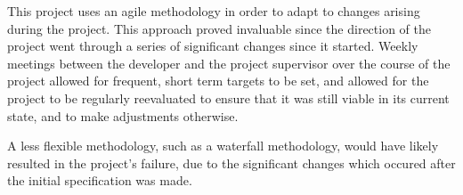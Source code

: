 


This project uses an agile methodology in order to adapt to changes arising during the project. This approach proved invaluable since the direction of the project went through a series of significant changes since it started. Weekly meetings between the developer and the project supervisor over the course of the project allowed for frequent, short term targets to be set, and allowed for the project to be regularly reevaluated to ensure that it was still viable in its current state, and to make adjustments otherwise.

A less flexible methodology, such as a waterfall methodology, would have likely resulted in the project's failure, due to the significant changes which occured after the initial specification was made.


